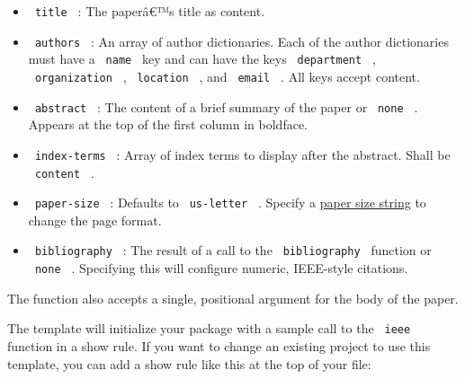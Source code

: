 \begin{itemize}
\tightlist
\item
  \texttt{\ title\ } : The paperâ€™s title as content.
\item
  \texttt{\ authors\ } : An array of author dictionaries. Each of the
  author dictionaries must have a \texttt{\ name\ } key and can have the
  keys \texttt{\ department\ } , \texttt{\ organization\ } ,
  \texttt{\ location\ } , and \texttt{\ email\ } . All keys accept
  content.
\item
  \texttt{\ abstract\ } : The content of a brief summary of the paper or
  \texttt{\ none\ } . Appears at the top of the first column in
  boldface.
\item
  \texttt{\ index-terms\ } : Array of index terms to display after the
  abstract. Shall be \texttt{\ content\ } .
\item
  \texttt{\ paper-size\ } : Defaults to \texttt{\ us-letter\ } . Specify
  a
  \href{https://typst.app/docs/reference/layout/page/\#parameters-paper}{paper
  size string} to change the page format.
\item
  \texttt{\ bibliography\ } : The result of a call to the
  \texttt{\ bibliography\ } function or \texttt{\ none\ } . Specifying
  this will configure numeric, IEEE-style citations.
\end{itemize}

The function also accepts a single, positional argument for the body of
the paper.

The template will initialize your package with a sample call to the
\texttt{\ ieee\ } function in a show rule. If you want to change an
existing project to use this template, you can add a show rule like this
at the top of your file:

